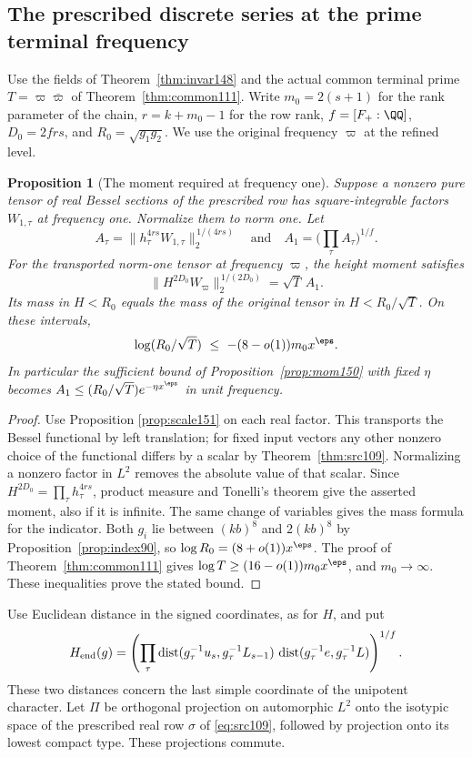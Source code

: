 \documentclass[a4paper,11pt]{article}
\newtheorem{proposition}{Proposition}[section]
\theoremstyle{definition}
\theoremstyle{remark}
\numberwithin{equation}{section}
\begin{document}
\subsection{The prescribed discrete series at the prime terminal frequency}\label{nav:VII-23}
Use the fields of Theorem~\ref{thm:invar148} and the actual
common terminal prime \(T=\varpi\bar\varpi\) of
Theorem~\ref{thm:common111}. Write \(m_0=2(s+1)\) for the rank
parameter of the chain, \(r=k+m_0-1\) for the row rank,
\(f=[F_+:\QQ]\), \(D_0=2frs\), and \(R_0=\sqrt{g_1g_2}\).
We use the original frequency \(\varpi\) at the refined level.

\begin{proposition}[The moment required at frequency one]
\label{prop:scale152}
Suppose a nonzero pure tensor of real Bessel sections of the
prescribed row has square-integrable factors \(W_{1,\tau}\)
at frequency one. Normalize them to norm one. Let
\[
        A_\tau=
             \|h_\tau^{4rs}W_{1,\tau}\|_2^{\,1/(4rs)}
             \quad\text{and}\quad A_1=\Big(\prod_\tau A_\tau\Big)^{1/f}.
\]
For the transported norm-one tensor at frequency \(\varpi\),
the height moment satisfies
\[
        \|H^{2D_0}W_\varpi\|_2^{\,1/(2D_0)}=\sqrt T\,A_1 .
\]
Its mass in \(H<R_0\) equals the mass of the original tensor
in \(H<R_0/\sqrt T\). On these intervals,
\[
  \log(R_0/\sqrt T)\ \le\ -(8-o(1))m_0x^\eps .
\]
In particular the sufficient bound of
Proposition~\ref{prop:mom150} with fixed \(\eta\) becomes
\(A_1\le(R_0/\sqrt T)e^{-\eta x^\eps}\) in unit frequency.
\end{proposition}
\begin{proof}
Use Proposition \ref{prop:scale151}
on each real factor. This transports the Bessel functional by
left translation; for fixed input vectors any other nonzero
choice of the functional differs by a scalar by
Theorem~\ref{thm:src109}. Normalizing a nonzero factor in
\(L^2\) removes the absolute value of that scalar. Since
\(H^{2D_0}=\prod_\tau h_\tau^{4rs}\), product measure and
Tonelli's theorem give the asserted moment, also if it is
infinite. The same change of variables gives the mass formula
for the indicator. Both \(g_i\) lie between \((kb)^8\) and
\(2(kb)^8\) by Proposition~\ref{prop:index90}, so
\(\log R_0=(8+o(1))x^\eps\).
The proof of Theorem~\ref{thm:common111} gives
\(\log T\ge(16-o(1))m_0 x^\eps\), and \(m_0\to\infty\).
These inequalities prove the stated bound.
\end{proof}

Use Euclidean distance in the signed coordinates, as for \(H\),
and put
\[
 H_{\rm end}(g)=
 \left(\prod_\tau
  \operatorname{dist}(g_\tau^{-1}u_s,g_\tau^{-1}L_{s-1})\,
  \operatorname{dist}(g_\tau^{-1}e,g_\tau^{-1}L)\right)^{1/f}.
\]
These two distances concern the last simple coordinate of the
unipotent character. Let \(\Pi\) be orthogonal projection on
automorphic \(L^2\) onto the isotypic space of the prescribed
real row \(\sigma\) of \eqref{eq:src109}, followed by projection
onto its lowest compact type. These projections commute.
\end{document}
